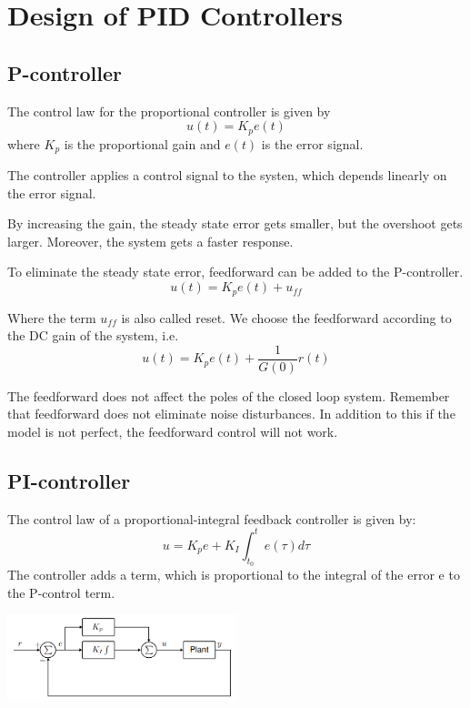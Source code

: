 \section{Design of PID Controllers}

\subsection{P-controller}

The control law for the proportional controller is given by
$$ u(t) = K_p e(t) $$
where $K_p$ is the proportional gain and $e(t)$ is the error signal.

The controller applies a control signal to the systen,
which depends linearly on the error signal.

By increasing the gain, the steady state error gets smaller, but the overshoot
gets larger. Moreover, the system gets a faster response.

To eliminate the steady state error, feedforward
can be added to the P-controller.
$$ u(t) = K_p e(t) + u_{ff} $$

Where the term $u_{ff}$ is also called reset. We choose the feedforward
according to the DC gain of the system, i.e.
$$ u(t) = K_p e(t) + \frac{1}{G(0)} r(t) $$

The feedforward does not affect the poles of the closed loop system. Remember that feedforward does not eliminate noise disturbances.
In addition to this if the model is not perfect, the feedforward control will not work.

\subsection{PI-controller}

The control law of a proportional-integral feedback controller is given by:
$$u = K_p e + K_I \int_{t_0}^t e(\tau) d\tau$$
The controller adds a term, which is proportional to the integral of the error
e to the P-control term.

\begin{center}
	\includegraphics[width = 0.5\textwidth]{Images/PI-controller.png}
\end{center}

